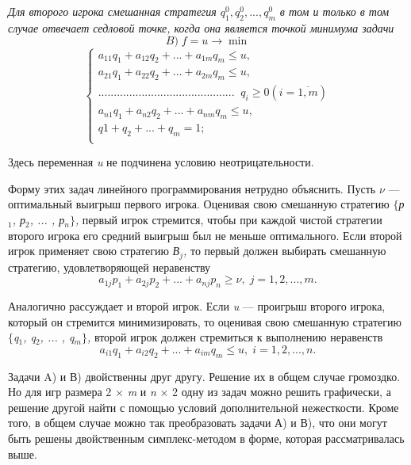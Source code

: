 \emph{Для второго игрока смешанная стратегия $q_{1}^0, q_{2}^0, ..., q_{m}^0$   в том и только в том случае отвечает седловой точке, когда она является точкой минимума задачи}
\begin{equation}
\label{equation_4_10}
B) \; f = u \to \min
\end{equation}
\begin{equation}
\label{equation_4_11}
\begin{cases}
a_{11}q_{1} + a_{12}q_{2} + ... + a_{1m}q_{m} \leqslant u, \\
a_{21}q_{1} + a_{22}q_{2} + ... + a_{2m}q_{m} \leqslant u, \\
............................................ \; \; q_{i} \geqslant 0 (i = \overline{1, m}) \\
a_{n1}q_{1} + a_{n2}q_{2} + ... + a_{nm}q_{m} \leqslant u, \\
q{1} + q_{2} + ... + q_{m} = 1; \\
\end{cases}
\end{equation}


Здесь переменная \emph{u} не подчинена условию неотрицательности.

Форму этих задач линейного программирования нетрудно объяснить. Пусть $\nu$ — оптимальный выигрыш первого игрока. Оценивая свою смешанную стратегию \emph{$\{$р$_{1}$, р$_{2}$, ... , р$_{n}\}$,} первый игрок стремится, чтобы при каждой чистой стратегии второго игрока его средний выигрыш был не меньше оптимального. Если второй игрок применяет свою стратегию \emph{В$_{j}$,} то первый должен выбирать смешанную стратегию, удовлетворяющей неравенству
\begin{equation}
\label{equation_4_12}
a_{1j}p_{1} + a_{2j}p_{2} + ... + a_{nj}p_{n} \geqslant \nu, \; j = 1, 2, ..., m.
\end{equation}

Аналогично рассуждает и второй игрок. Если \emph{u} — проигрыш второго игрока, который он стремится минимизировать, то оценивая свою смешанную стратегию \emph{$\{$q$_{1}$, q$_{2}$, ... , q$_{m}\}$,} второй игрок должен стремиться к выполнению неравенств
\begin{equation}
\label{equation_4_13}
a_{i1}q_{1} + a_{i2}q_{2} + ... + a_{im}q_{m} \leqslant u, \; i = 1, 2, ..., n.
\end{equation}

Задачи A) и В) двойственны друг другу. Решение их в общем случае громоздко. Но для игр размера 2 $\times$ \emph{m} и \emph{n} $\times$ 2 одну из задач можно решить графически, а решение другой найти с помощью условий дополнительной нежесткости. Кроме того, в общем случае можно так преобразовать задачи А) и В), что они могут быть решены двойственным симплекс-методом в форме, которая рассматривалась выше.

